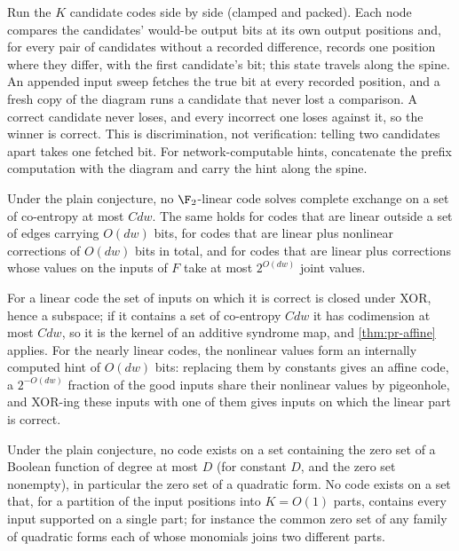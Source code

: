 \begin{outline}
Run the $K$ candidate codes side by side (clamped and packed). Each node compares the candidates'
would-be output bits at its own output positions and, for every pair of candidates without a recorded
difference, records one position where they differ, with the first candidate's bit; this state
travels along the spine. An appended input sweep fetches the true bit at every recorded position, and
a fresh copy of the diagram runs a candidate that never lost a comparison. A correct candidate never
loses, and every incorrect one loses against it, so the winner is correct. This is discrimination,
not verification: telling two candidates apart takes one fetched bit. For network-computable hints,
concatenate the prefix computation with the diagram and carry the hint along the spine.
\end{outline}

\begin{theorem}\label{thm:pr-linear}
Under the plain conjecture, no $\F_2$-linear code solves complete exchange on a set of co-entropy at
most $Cdw$. The same holds for codes that are linear outside a set of edges carrying $O(dw)$ bits, for
codes that are linear plus nonlinear corrections of $O(dw)$ bits in total, and for codes that are
linear plus corrections whose values on the inputs of $F$ take at most $2^{O(dw)}$ joint values.
\end{theorem}

\begin{outline}
For a linear code the set of inputs on which it is correct is closed under XOR, hence a subspace; if it
contains a set of co-entropy $Cdw$ it has codimension at most $Cdw$, so it is the kernel of an additive
syndrome map, and \cref{thm:pr-affine} applies. For the nearly linear codes, the nonlinear values form
an internally computed hint of $O(dw)$ bits: replacing them by constants gives an affine code, a
$2^{-O(dw)}$ fraction of the good inputs share their nonlinear values by pigeonhole, and XOR-ing these
inputs with one of them gives inputs on which the linear part is correct.
\end{outline}

\begin{theorem}\label{thm:pr-degree}
Under the plain conjecture, no code exists on a set containing the zero set of a Boolean function of
degree at most $D$ (for constant $D$, and the zero set nonempty), in particular the zero set of a
quadratic form. No code exists on a set that, for a partition of the input positions into $K=O(1)$
parts, contains every input supported on a single part; for instance the common zero set of any
family of quadratic forms each of whose monomials joins two different parts.
\end{theorem}

